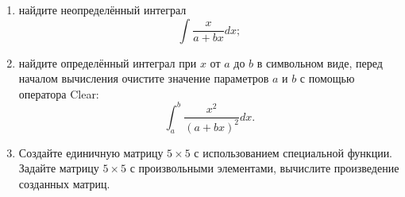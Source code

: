 \begin{enumerate}
\begin{figure}[H]
        \label{fig:image_self_1_3}
    \end{figure}
    \item найдите неопределённый интеграл
    \[ \int\frac{x}{a+ bx}dx; \]
    \begin{figure}[H]
        \renewcommand{\figurename}{Рисунок}
        \label{fig:image_self_1_4}
    \end{figure}
    \item найдите определённый интеграл при $x$ от $a$ до $b$ в символьном виде, перед началом вычисления очистите значение
    параметров $a$ и $b$ с помощью оператора Clear:
    \[ \int_{a}^b\frac{x^2}{(a+bx)^2}dx. \]
    \begin{figure}[H]
        \renewcommand{\figurename}{Рисунок}
        \label{fig:image_self_1_5}
    \end{figure}
    \item Создайте единичную матрицу $5\times5$ с использованием специальной функции.
    Задайте матрицу $5\times5$ с произвольными элементами, вычислите произведение созданных матриц.
    \begin{figure}[H]
        \renewcommand{\figurename}{Рисунок}

\end{figure}
\end{enumerate}
